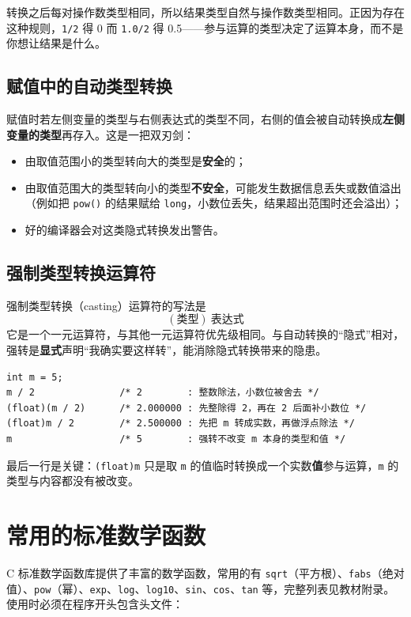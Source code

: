 转换之后每对操作数类型相同，所以结果类型自然与操作数类型相同。正因为存在这种规则，\texttt{1/2} 得 0 而 \texttt{1.0/2} 得 0.5——参与运算的类型决定了运算本身，而不是你想让结果是什么。

\subsection{赋值中的自动类型转换}

赋值时若左侧变量的类型与右侧表达式的类型不同，右侧的值会被自动转换成\textbf{左侧变量的类型}再存入。这是一把双刃剑：

\begin{itemize}
  \item 由取值范围小的类型转向大的类型是\textbf{安全}的；
  \item 由取值范围大的类型转向小的类型\textbf{不安全}，可能发生数据信息丢失或数值溢出（例如把 \texttt{pow()} 的结果赋给 \texttt{long}，小数位丢失，结果超出范围时还会溢出）；
  \item 好的编译器会对这类隐式转换发出警告。
\end{itemize}

\subsection{强制类型转换运算符}

强制类型转换（casting）运算符的写法是
\[
(\text{类型})\ \text{表达式}
\]
它是一个一元运算符，与其他一元运算符优先级相同。与自动转换的“隐式”相对，强转是\textbf{显式}声明“我确实要这样转”，能消除隐式转换带来的隐患。

\begin{lstlisting}
int m = 5;
m / 2               /* 2        : 整数除法，小数位被舍去 */
(float)(m / 2)      /* 2.000000 : 先整除得 2，再在 2 后面补小数位 */
(float)m / 2        /* 2.500000 : 先把 m 转成实数，再做浮点除法 */
m                   /* 5        : 强转不改变 m 本身的类型和值 */
\end{lstlisting}

最后一行是关键：\texttt{(float)m} 只是取 \texttt{m} 的值临时转换成一个实数\textbf{值}参与运算，\texttt{m} 的类型与内容都没有被改变。

\section{常用的标准数学函数}

C 标准数学函数库提供了丰富的数学函数，常用的有 \texttt{sqrt}（平方根）、\texttt{fabs}（绝对值）、\texttt{pow}（幂）、\texttt{exp}、\texttt{log}、\texttt{log10}、\texttt{sin}、\texttt{cos}、\texttt{tan} 等，完整列表见教材附录。使用时必须在程序开头包含头文件：

